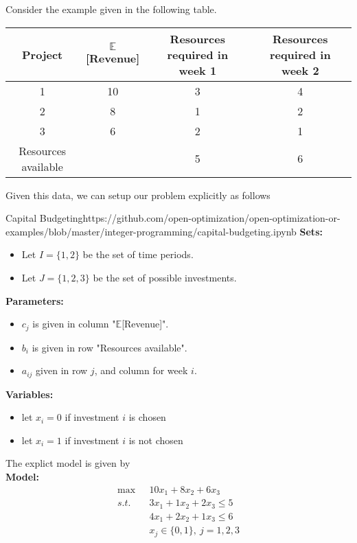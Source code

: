 \newpage
Consider the example given in the following table.
	\begin{table}[h]
			\begin{tabular}{|c|c|c|c|}%
				\hline
				Project & $\mathbb{E}$[Revenue] & Resources required in week 1 & Resources required in week 2\\\hline
				\rowcolor{gray!10} 1 & 10 & 3 & 4\\
				\hline
				2 & 8 & 1 & 2\\\hline
				\rowcolor{gray!10} 3 & 6 & 2 & 1\\
				\hline
				Resources available & & 5 & 6\\
				\hline
		\end{tabular}
	\end{table}


Given this data, we can setup our problem explicitly as follows

\begin{examplewithcode}{Capital Budgeting}{https://github.com/open-optimization/open-optimization-or-examples/blob/master/integer-programming/capital-budgeting.ipynb}
\noindent \textbf{Sets:}
\begin{itemize}
\item Let $I = \{1,2\}$ be the set of time periods.
\item Let $J = \{1, 2,3\}$ be the set of possible investments.
\end{itemize}

\noindent \textbf{Parameters:}
\begin{itemize}
\item $c_j$ is given in column "$\mathbb{E}$[Revenue]".
\item $b_i$ is given in row "Resources available".
\item $a_{ij}$ given in row $j$, and column for week $i$.
\end{itemize}

\noindent \textbf{Variables:}
\begin{itemize}
\item let $x_i = 0$ if investment $i$ is chosen
\item let $x_i = 1$ if investment $i$ is not chosen
\end{itemize}

The explict model is given by\\
\noindent  \textbf{Model:}
\begin{align*}
	\max\ \ \  & 10x_1+8x_2+6x_3 \tag{Total Expected Revenue}\\
	s.t. \ \ & 
	3x_1+1x_2+2x_3\leq5 \tag{ Resource constraint week 1}\\
	&4x_1+2x_2+1x_3\leq6 \tag{ Resource constraint week 2}\\
&x_j \in \{0,1\},\  j = 1,2,3
\end{align*}

\end{examplewithcode}
